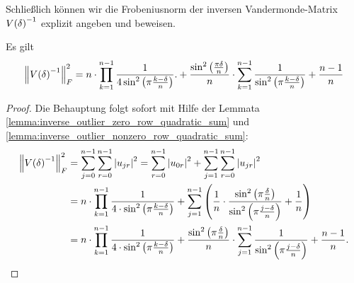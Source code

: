Schließlich können wir die Frobeniusnorm der inversen Vandermonde-Matrix
$V \! \left( \delta \right)^{-1}$ explizit angeben und beweisen.
\begin{theorem}
    Es gilt
    \begin{equation}
        \left\lVert  V \! \left( \delta \right)^{-1}  \right\rVert_F^2
        = n \cdot \prod_{k=1}^{n-1} \frac{1}{4 \sin^2 \left( \pi \frac{k-\delta}{n} \right)}.
          + \frac{\sin^2 \left( \frac{\pi \delta}{n} \right)}{n} \cdot \sum_{k=1}^{n-1} \frac{1}{\sin^2 \left( \pi \frac{k-\delta}{n} \right)}
          + \frac{n-1}{n}
    \end{equation}
\end{theorem}
\begin{proof}
    Die Behauptung folgt sofort mit Hilfe der Lemmata
    \ref{lemma:inverse_outlier_zero_row_quadratic_sum} und
    \ref{lemma:inverse_outlier_nonzero_row_quadratic_sum}:
    \[
        \begin{split}
            \left\lVert  V \! \left( \delta \right)^{-1}  \right\rVert_F^2
            &= \sum_{j=0}^{n-1} \sum_{r=0}^{n-1} \left\lvert u_{jr} \right\rvert^2
             = \sum_{r=0}^{n-1} \left\lvert u_{0r} \right\rvert^2
             + \sum_{j=1}^{n-1} \sum_{r=0}^{n-1} \left\lvert u_{jr} \right\rvert^2\\
            &= n \cdot \prod_{k=1}^{n-1} \frac{1}{4 \cdot \sin^2 \left( \pi \frac{k-\delta}{n} \right)}
             + \sum_{j=1}^{n-1} \left( \frac{1}{n} \cdot \frac{\sin^2 \left( \pi \frac{\delta}{n} \right)}{\sin^2 \left( \pi \frac{j - \delta}{n} \right)}
             + \frac{1}{n} \right)\\
            &= n \cdot \prod_{k=1}^{n-1} \frac{1}{4 \cdot \sin^2 \left( \pi \frac{k-\delta}{n} \right)}
             + \frac{\sin^2 \left( \pi \frac{\delta}{n} \right)}{n} \cdot \sum_{j=1}^{n-1} \frac{1}{\sin^2 \left( \pi \frac{j - \delta}{n} \right)}
             + \frac{n-1}{n}.
         \end{split}
     \]
\end{proof}
